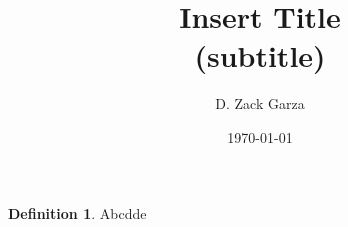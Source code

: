 \documentclass[11pt]{article}
\title{
	\textbf{Insert Title}\\ 
	{\normalsize (subtitle)}
}
\author{D. Zack Garza}
\date{\today}
\theoremstyle{plain}
\theoremstyle{definition}
\newtheorem{defn}[thm]{Definition} %
\begin{document}
\maketitle

\begin{defn}
Abcdde\cite{	hatcherAlgebraicTopologya}
\end{defn}

 

\end{document}
